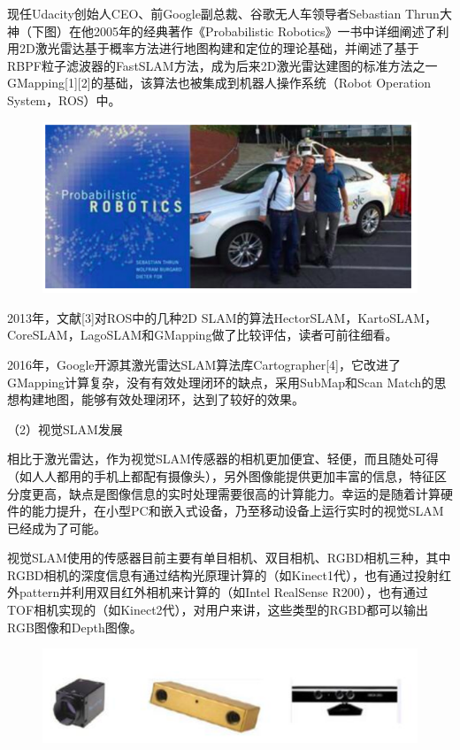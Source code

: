 现任Udacity创始人CEO、前Google副总裁、谷歌无人车领导者Sebastian Thrun大神（下图）在他2005年的经典著作《Probabilistic Robotics》一书中详细阐述了利用2D激光雷达基于概率方法进行地图构建和定位的理论基础，并阐述了基于RBPF粒子滤波器的FastSLAM方法，成为后来2D激光雷达建图的标准方法之一GMapping[1][2]的基础，该算法也被集成到机器人操作系统（Robot Operation System，ROS）中。
\begin{figure}[h]%
	\centering  %
	\includegraphics[width=0.7\linewidth]{image/Talk/4.png}  %

\end{figure}


2013年，文献[3]对ROS中的几种2D SLAM的算法HectorSLAM，KartoSLAM，CoreSLAM，LagoSLAM和GMapping做了比较评估，读者可前往细看。

2016年，Google开源其激光雷达SLAM算法库Cartographer[4]，它改进了GMapping计算复杂，没有有效处理闭环的缺点，采用SubMap和Scan Match的思想构建地图，能够有效处理闭环，达到了较好的效果。

（2）视觉SLAM发展

相比于激光雷达，作为视觉SLAM传感器的相机更加便宜、轻便，而且随处可得（如人人都用的手机上都配有摄像头），另外图像能提供更加丰富的信息，特征区分度更高，缺点是图像信息的实时处理需要很高的计算能力。幸运的是随着计算硬件的能力提升，在小型PC和嵌入式设备，乃至移动设备上运行实时的视觉SLAM已经成为了可能。

视觉SLAM使用的传感器目前主要有单目相机、双目相机、RGBD相机三种，其中RGBD相机的深度信息有通过结构光原理计算的（如Kinect1代），也有通过投射红外pattern并利用双目红外相机来计算的（如Intel RealSense R200），也有通过TOF相机实现的（如Kinect2代），对用户来讲，这些类型的RGBD都可以输出RGB图像和Depth图像。

\begin{figure}[h]%
	\centering  %
	\includegraphics[width=0.7\linewidth]{image/Talk/5.png}  %

\end{figure}


